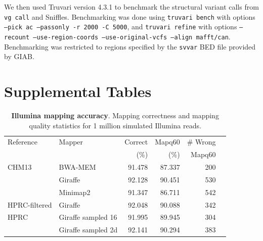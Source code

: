 \documentclass[11pt]{ucscthesis}
\begin{document}
We then used Truvari version 4.3.1 to benchmark the structural variant calls from \texttt{vg call} and Sniffles.
Benchmarking was done using \texttt{truvari bench} with options \texttt{--pick ac --passonly -r 2000 -C 5000}, and \texttt{truvari refine} with options \texttt{--recount --use-region-coords --use-original-vcfs --align mafft/can}.
Benchmarking was restricted to regions specified by the \texttt{svvar} BED file provided by GIAB.

\section{Supplemental Tables}

\begin{table}[htb]
    \centering
    \begin{tabular}{|l|l|r|r|r|r|}
    \hline
    Reference          & Mapper                 & Correct         & Mapq60          & \# Wrong  \\
                       &                        & (\%)            & (\%)            & Mapq60   \\
    \hline
    CHM13              & BWA-MEM                & 91.478          & 87.337         & 200 \\
                       & Giraffe                & 92.128          & 90.451         & 530 \\
                       & Minimap2               & 91.347          & 86.711         & 542 \\
    HPRC-filtered      & Giraffe                & 92.048          & 90.088         & 342 \\
    HPRC               & Giraffe sampled 16     & 91.995          & 89.945         & 304 \\
                       & Giraffe sampled 2d     & 92.141          & 90.294         & 383 \\
    \hline
    \end{tabular}
    \caption[Illumina mapping accuracy]{\textbf{Illumina mapping accuracy}. Mapping correctness and mapping quality statistics for 1 million simulated Illumina reads.}
    \label{tab:sup-illumina-sim}
\end{table}
\end{document}
